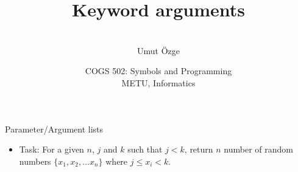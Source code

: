 \documentclass[ignorenonframetext,10pt,aspectratio=169]{beamer}
\title{Keyword arguments}
\author{\  \\ \vspace{20pt} Umut \"Ozge\\  }
\date{COGS 502: Symbols and Programming \\ METU, Informatics}
\begin{document}
\begin{frame}\frametitle{}
\thispagestyle{empty}
\maketitle
\end{frame}

\begin{frame}[t,plain]{Parameter/Argument lists}

\end{frame}

\begin{frame}[t,plain]{}
\begin{itemize}
\item Task: For a given $n$, $j$  and $k$ such that $j < k$, return $n$ number of random numbers $\{x_1,x_2,\ldots x_n\}$ where $j\leq x_i < k$.
\end{itemize}
\end{frame}


\begin{frame}[t,plain]{}


\end{frame}

\begin{frame}[t,plain]{}


\end{frame}

\begin{frame}[t,plain]{}


\end{frame}

\begin{frame}[t,plain]{}


\end{frame}
\end{document}
